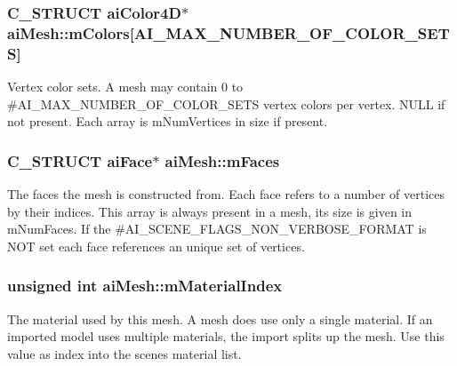 \subsubsection[{\texorpdfstring{m\+Colors}{mColors}}]{\setlength{\rightskip}{0pt plus 5cm}C\+\_\+\+S\+T\+R\+U\+CT {\bf ai\+Color4D}$\ast$ ai\+Mesh\+::m\+Colors\mbox{[}A\+I\+\_\+\+M\+A\+X\+\_\+\+N\+U\+M\+B\+E\+R\+\_\+\+O\+F\+\_\+\+C\+O\+L\+O\+R\+\_\+\+S\+E\+TS\mbox{]}}\hypertarget{structai_mesh_ad9215f67bd0c2277b10775a8adb66b96}{}\label{structai_mesh_ad9215f67bd0c2277b10775a8adb66b96}
Vertex color sets. A mesh may contain 0 to \#\+A\+I\+\_\+\+M\+A\+X\+\_\+\+N\+U\+M\+B\+E\+R\+\_\+\+O\+F\+\_\+\+C\+O\+L\+O\+R\+\_\+\+S\+E\+TS vertex colors per vertex. N\+U\+LL if not present. Each array is m\+Num\+Vertices in size if present. 
\subsubsection[{\texorpdfstring{m\+Faces}{mFaces}}]{\setlength{\rightskip}{0pt plus 5cm}C\+\_\+\+S\+T\+R\+U\+CT {\bf ai\+Face}$\ast$ ai\+Mesh\+::m\+Faces}\hypertarget{structai_mesh_a5a65fbc7fdea7f8d36f39047425ece07}{}\label{structai_mesh_a5a65fbc7fdea7f8d36f39047425ece07}
The faces the mesh is constructed from. Each face refers to a number of vertices by their indices. This array is always present in a mesh, its size is given in m\+Num\+Faces. If the \#\+A\+I\+\_\+\+S\+C\+E\+N\+E\+\_\+\+F\+L\+A\+G\+S\+\_\+\+N\+O\+N\+\_\+\+V\+E\+R\+B\+O\+S\+E\+\_\+\+F\+O\+R\+M\+AT is N\+OT set each face references an unique set of vertices. 
\subsubsection[{\texorpdfstring{m\+Material\+Index}{mMaterialIndex}}]{\setlength{\rightskip}{0pt plus 5cm}unsigned int ai\+Mesh\+::m\+Material\+Index}\hypertarget{structai_mesh_aa2807c7ba172115203ed16047ad65f9e}{}\label{structai_mesh_aa2807c7ba172115203ed16047ad65f9e}
The material used by this mesh. A mesh does use only a single material. If an imported model uses multiple materials, the import splits up the mesh. Use this value as index into the scene\textquotesingle{}s material list. 
